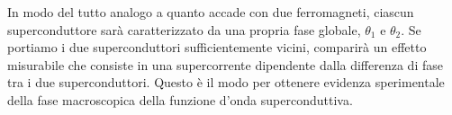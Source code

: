 In modo del tutto analogo a quanto accade con due ferromagneti, ciascun superconduttore sarà caratterizzato da una propria fase globale, $\theta_1$ e $
\theta_2$. Se portiamo i due superconduttori sufficientemente vicini, comparirà un effetto misurabile che consiste in una supercorrente dipendente dalla differenza di fase tra i due superconduttori. Questo è il modo per ottenere evidenza sperimentale della fase macroscopica della funzione d'onda superconduttiva.
% 
